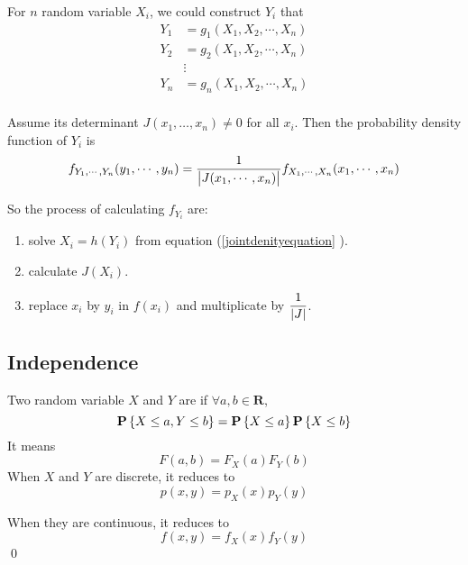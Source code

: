 For $n$ random variable $X_i$, we could construct $Y_i$ that
\begin{equation}\label{jointdenityequation}
    \begin{aligned}
        Y_1 &= g_1 (X_1, X_2, \cdots, X_n) \\
        Y_2 &= g_2 (X_1, X_2, \cdots, X_n) \\
        & \vdots \\
        Y_n &= g_n (X_1, X_2, \cdots, X_n) \\
    \end{aligned}
\end{equation}

Assume its  determinant $J(x_1, \dots, x_n) \neq 0$ for all $x_i$. Then the probability density function of $Y_i$ is 
\begin{equation}
    f_{Y_1, \cdots, Y_n}(y_1, \cdots, y_n) = \frac{1}{\displaystyle \left\lvert J(x_1, \cdots, x_n) \right\rvert} f_{X_1, \cdots, X_n}(x_1, \cdots , x_n)
\end{equation}

So the process of calculating $f_{Y_i}$ are:
\begin{enumerate}
    \item solve $X_i = h(Y_i)$ from equation (\ref{jointdenityequation} ).
    \item calculate $J(X_i)$.
    \item replace $x_i$ by $y_i$ in $f(x_i)$ and multiplicate by $\displaystyle \frac{1}{\displaystyle \left\lvert J \right\rvert}$.
\end{enumerate}


\subsection{Independence}

\begin{definition}
    Two random variable $X$ and $Y$ are  if $\forall a,b \in \mathbf{R}$,
    \begin{equation}
        \mathop{\bf P\/}\displaystyle \left\{ X \leq a , Y \leq b \right\} = \mathop{\bf P\/}\displaystyle \left\{ X \leq a \right\} \mathop{\bf P\/}\displaystyle \left\{ X \leq b \right\}
    \end{equation}
    It means
    \begin{equation}
        F(a,b) = F_X(a) F_Y(b)
    \end{equation}
    When $X$ and $Y$ are discrete, it reduces to
    \begin{equation}
        p(x,y) = p_X(x) p_Y(y)
    \end{equation}
    
    When they are continuous, it reduces to
    \begin{equation}
        f(x,y)=f_X(x) f_Y(y)
    \end{equation}
    \qed
\end{definition}

